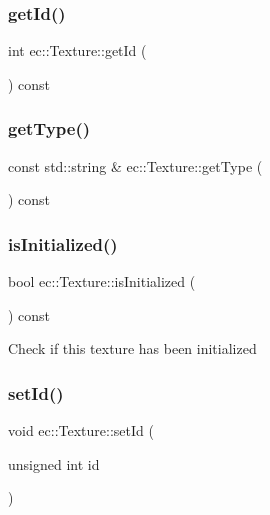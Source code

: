 \subsubsection{\texorpdfstring{get\+Id()}{getId()}}
{\footnotesize\ttfamily int ec\+::\+Texture\+::get\+Id (\begin{DoxyParamCaption}{ }\end{DoxyParamCaption}) const}

\mbox{\label{classec_1_1_texture_a1c33bc610c0b5c7807fa92897320349f}} 
\subsubsection{\texorpdfstring{get\+Type()}{getType()}}
{\footnotesize\ttfamily const std\+::string \& ec\+::\+Texture\+::get\+Type (\begin{DoxyParamCaption}{ }\end{DoxyParamCaption}) const}

\mbox{\label{classec_1_1_texture_ab81c62fde2f54dfbb5895a421224fcd9}} 
\subsubsection{\texorpdfstring{is\+Initialized()}{isInitialized()}}
{\footnotesize\ttfamily bool ec\+::\+Texture\+::is\+Initialized (\begin{DoxyParamCaption}{ }\end{DoxyParamCaption}) const}

Check if this texture has been initialized \mbox{\label{classec_1_1_texture_af3555f8dda9a13babcb96d40d4417813}} 
\subsubsection{\texorpdfstring{set\+Id()}{setId()}}
{\footnotesize\ttfamily void ec\+::\+Texture\+::set\+Id (\begin{DoxyParamCaption}\item[{unsigned int}]{id }\end{DoxyParamCaption})}

